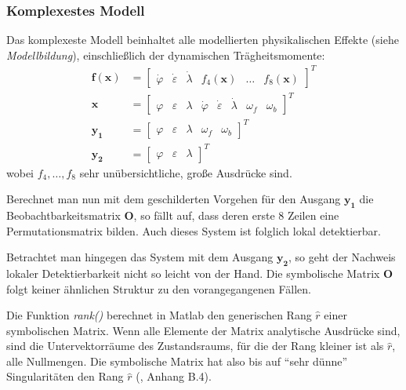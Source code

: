 \documentclass[10pt,twocolumn]{article}
\begin{document}
	\subsubsection{Komplexestes Modell}
	Das komplexeste Modell beinhaltet alle modellierten physikalischen Effekte (siehe \textit{Modellbildung}), einschließlich der dynamischen Trägheitsmomente:
	\begin{align*}
	\bm f(\bm x) &= \begin{bmatrix}
	\dot \varphi &
	\dot \varepsilon &
	\dot \lambda  &
	f_4(\bm x) &
	\ldots &
	f_8(\bm x)
	\end{bmatrix}^T\\
	\bm x &= \begin{bmatrix}
	\varphi & \varepsilon & \lambda & \dot \varphi & \dot \varepsilon & \dot \lambda & \omega_f & \omega_b
	\end{bmatrix}^T \\ 
	\bm {y_1} &= \begin{bmatrix}
	\varphi & \varepsilon & \lambda & \omega_f & \omega_b
	\end{bmatrix}^T \\
	\bm {y_2} &= \begin{bmatrix}
	\varphi & \varepsilon & \lambda 
	\end{bmatrix}^T
	\end{align*}
	wobei $f_4, \ldots, f_8$ sehr unübersichtliche, große Ausdrücke sind.
	
	Berechnet man nun mit dem geschilderten Vorgehen für den Ausgang $\bm{y_1}$
	die Beobachtbarkeitsmatrix $\bm O$, so fällt auf, dass deren erste 8 Zeilen eine Permutationsmatrix bilden.
	Auch dieses System ist folglich lokal detektierbar.
	
	Betrachtet man hingegen das System mit dem Ausgang $\bm{y_2}$, so geht der Nachweis lokaler Detektierbarkeit nicht so leicht von der Hand. 
	Die symbolische Matrix $\bm O$ folgt keiner ähnlichen Struktur zu den vorangegangenen Fällen.

	
	Die Funktion \textit{rank()} berechnet in Matlab den generischen Rang $\hat r$ einer symbolischen Matrix. Wenn alle Elemente der Matrix analytische Ausdrücke sind, sind die Untervektorräume des Zustandsraums, für die der Rang kleiner ist als $\hat r$, alle Nullmengen. Die symbolische Matrix hat also bis auf \enquote{sehr dünne} Singularitäten den Rang $\hat r$ (\cite{ex3}, Anhang B.4).
	
\end{document}
